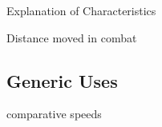\begin{Chapter}{Explanation of Characteristics}
\begin{Itemize}

\item Distance moved in combat 

\end{Itemize}

\subsection{Generic Uses}

\begin{Itemize}

\item comparative speeds 

\end{Itemize}

\end{Chapter}
